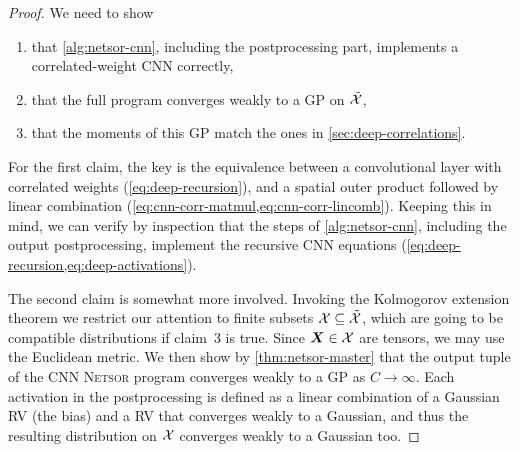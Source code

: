 \documentclass[accepted]{uai2021} %
\newcommand{\Netsor}{\textsc{Netsor}\xspace}
\newcommand{\0}{\boldsymbol{0}}
\newcommand{\1}{\boldsymbol{1}}
\newcommand{\crefp}[1]{(\cref{#1})}
\newcommand{\eqparref}{\crefp}
\newcommand{\eqparreftwo}[2]{\crefp{#1,#2}}
\begin{document}
\begin{proof}
  We need to show
  \begin{enumerate}
    \item that \cref{alg:netsor-cnn}, including the postprocessing part, implements a correlated-weight CNN correctly,
    \item that the full program converges weakly to a \ac{GP} on $\tilde{{\mathcal{X}}}$,
    \item that the moments of this \ac{GP} match the ones in \cref{sec:deep-correlations}.
  \end{enumerate}

  For the first claim, the key is the equivalence between a convolutional layer
  with correlated weights \eqparref{eq:deep-recursion}, and a spatial outer
  product followed by linear combination
  \eqparreftwo{eq:cnn-corr-matmul}{eq:cnn-corr-lincomb}. Keeping this in mind, we
  can verify by inspection that the steps of \cref{alg:netsor-cnn}, including
  the output postprocessing, implement the recursive CNN equations
  \crefp{eq:deep-recursion,eq:deep-activations}.

  The second claim is somewhat more involved. Invoking the Kolmogorov extension
  theorem \citep[Thm.~2.4.3]{measure-theory-intro} we restrict our attention to finite
  subsets ${\mathcal{X}} \subseteq \tilde{{\mathcal{X}}}$, which are going to be compatible
  distributions if claim~3 is true. Since ${\bm{X}} \in {\mathcal{X}}$ are tensors, we may use the Euclidean metric.
  We then show by \cref{thm:netsor-master} that the output tuple of the CNN
  \Netsor program converges weakly to a GP as $C\to\infty$. Each activation in
  the postprocessing is defined as a linear combination of a Gaussian \ac{RV}
  (the bias) and a \ac{RV} that converges weakly to a Gaussian, and thus the resulting distribution on ${\mathcal{X}}$ converges weakly to a Gaussian too.


\end{proof}
\end{document}
